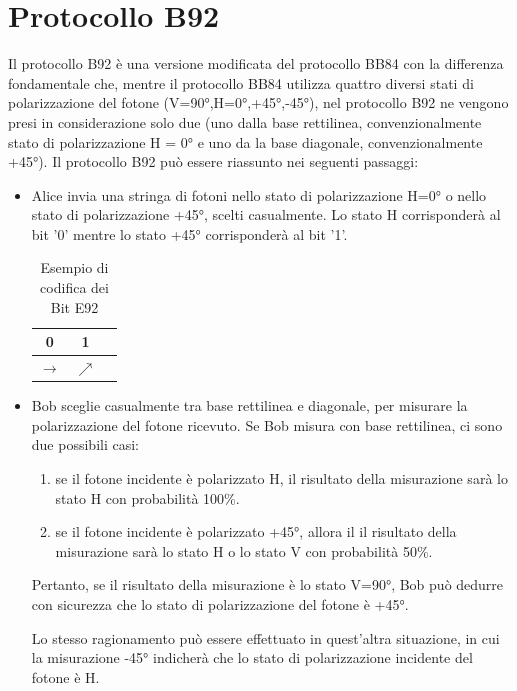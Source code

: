 \section{Protocollo B92}
Il protocollo B92 è una versione modificata del protocollo BB84 con la differenza fondamentale che, mentre il protocollo BB84 utilizza quattro diversi stati di polarizzazione del fotone (V=90°,H=0°,+45°,-45°), nel protocollo B92 ne vengono presi in considerazione solo due (uno dalla base rettilinea, convenzionalmente stato di polarizzazione H = 0° e uno da la base diagonale, convenzionalmente +45°). Il protocollo B92 può essere riassunto nei seguenti passaggi:
\begin{itemize}
    \item Alice invia una stringa di fotoni nello stato di polarizzazione H=0° o nello stato di polarizzazione +45°, scelti casualmente. Lo stato H corrisponderà al bit '0' mentre lo stato +45° corrisponderà al bit '1'.
    
    \begin{table}[H]
    \centering
        \begin{tabular}{|c|c|c|}
        \hline
        0 & 1\\
        \hline
        $\rightarrow$ & $\nearrow$\\
        \hline
        \end{tabular}
        \caption{Esempio di codifica dei Bit E92}
        \label{tab:codifica_bit_E92}
    \end{table}
    
    \item Bob sceglie casualmente tra base rettilinea e diagonale, per misurare la polarizzazione del fotone ricevuto.
    Se Bob misura con base rettilinea, ci sono due possibili casi: 
    \begin{enumerate}
        \item se il fotone incidente è polarizzato H, il risultato della misurazione sarà lo stato H con probabilità 100\%.
        \item se il fotone incidente è polarizzato +45°, allora il il risultato della misurazione sarà lo stato H o lo stato V con probabilità 50\%.
    \end{enumerate}   
    Pertanto, se il risultato della misurazione è lo stato V=90°, Bob può dedurre con sicurezza che lo stato di polarizzazione del fotone è +45°.
    
    Lo stesso ragionamento può essere effettuato in quest'altra situazione, in cui la misurazione -45° indicherà che lo stato di polarizzazione incidente del fotone è H.
    

\end{itemize}
